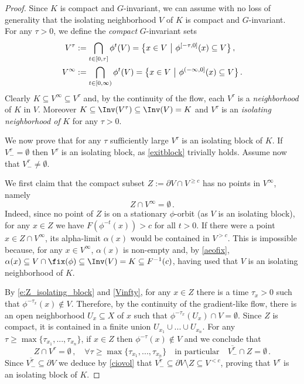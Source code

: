 \documentclass[11pt,a4paper,reqno]{article}
\numberwithin{equation}{section}
\theoremstyle{definition}
\begin{document}
\begin{proof}
Since $ K $ is compact and $G$-invariant, 
we can assume 
with no loss of generality 
that the 
isolating neighborhood $V$
of $K $ is compact and $G$-invariant. 
For any $\tau>0$, we define
the {\it compact}  $G$-invariant  sets
\begin{align}
 V^\tau & :=
\bigcap_{t\in[0,\tau]} \phi^t(V)
= 
\big\{ x \in V \ \big|  \ 
\phi^{[-\tau,0]}(x) \subseteq V \big\}\, ,  \notag \\
 V^\infty & :=\bigcap_{t\in[0,\infty)} \phi^t(V) = 
\big\{ x \in V \ \big|  \ 
\phi^{(-\infty,0]}(x) \subseteq V \big\}  \, . \label{Vinfty}
\end{align}
Clearly $ K \subseteq V^\infty \subseteq V^\tau $ and, 
by the continuity of the flow, each  $V^\tau$ is a  {\it neighborhood} of $ K $ in $ V $. 
Moreover 
 $ K \subseteq \Inv(V^\tau)  \subseteq \Inv(V) = K $  
 and 
 $ V^\tau$ is an {\it isolating neighborhood of} $ K $
 for any $ \tau > 0 $.

We now prove that for any $ \tau $  sufficiently large  $V^\tau$ is an isolating block of $ K $.
If $V^\tau_-=\emptyset $ then $V^\tau$ is an isolating block, as 
\eqref{exitblock} trivially holds.
Assume now that $V^\tau_-\neq\emptyset$.

We first claim that the compact subset $Z:=\partial V\cap 
V^{\geq c} $ has no points in  $ V^\infty $, namely  
\begin{equation}
\label{e:Z_isolating_block}
Z\cap V^\infty=\emptyset \, .  
\end{equation}
Indeed, since no point of $Z$ is on a stationary $\phi$-orbit (as $V$ is an isolating block), for any $x\in Z$ we have $F(\phi^{-t}(x))>c$ for all $t>0$. 
 If there were a point $x\in Z\cap V^\infty$, its alpha-limit $\alpha(x)$ would be contained in $ V^{>c}$. This  is impossible because,  %
 for any 
 $ x\in V^\infty $, 
 $ \alpha(x) 
$ is  non-empty and, by 
\eqref{aeofix}, 
$ \alpha(x)\subseteq V \cap \fix (\phi) \subseteq \Inv(V) = K \subseteq F^{-1}(c) $, having used that $V$ is an isolating neighborhood of $ K $. 

By \eqref{e:Z_isolating_block} and \eqref{Vinfty}, for any $x\in Z$ there is a time $\tau_x>0$ such that $\phi^{-\tau_x}(x)\not\in V$. Therefore, by the continuity of the gradient-like flow, there is an open neighborhood $U_x\subseteq X$ of $x$ such that $\phi^{-\tau_x}(U_x)\cap V=\emptyset$. Since $Z$ is compact, it is contained in a finite union  $U_{x_1}\cup...\cup U_{x_n}$. 
For any $\tau\geq \max\{\tau_{x_1}, ...,\tau_{x_n}\}$, if 
$ x \in  Z $ then $ \phi^{-\tau} (x) \notin V $ and   
we conclude that
\begin{equation}
\label{ciovol}
Z\cap V^\tau=\emptyset \, ,
\quad \forall 
\tau\geq \max\{\tau_{x_1}, ...,\tau_{x_n}\} \quad 
\text{in particular} 
\quad \overline{V^\tau_-} \cap Z = \emptyset \, . 
\end{equation}
Since 
$ \overline{V^\tau_-}\subseteq\partial V $
we deduce by \eqref{ciovol} that 
$ \overline{V^\tau_-}
\subseteq
\partial V\setminus Z\subseteq V^{<c} $, 
proving that $V^\tau$ is an isolating block of $K$.
\end{proof}
\end{document}
